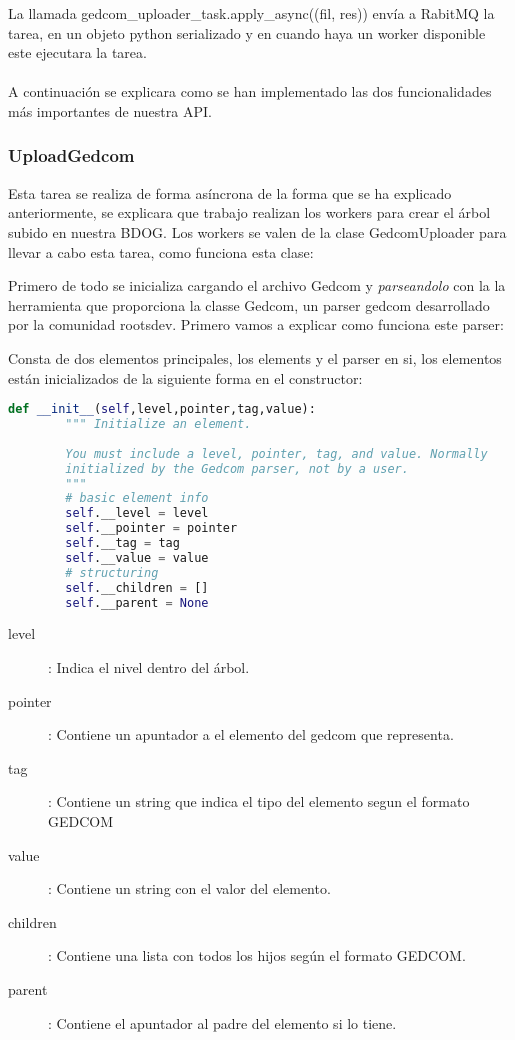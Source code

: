 La llamada gedcom\_uploader\_task.apply\_async((fil, res)) envía a RabitMQ la tarea, en un objeto python serializado y en cuando haya un worker disponible este ejecutara la tarea.\\\\
A continuación se explicara como se han implementado las dos funcionalidades más importantes de nuestra API.

\subsubsection{UploadGedcom}
Esta tarea se realiza de forma asíncrona de la forma que se ha explicado anteriormente, se explicara que trabajo realizan los workers para crear el árbol subido en nuestra BDOG.
Los workers se valen de la clase GedcomUploader para llevar a cabo esta tarea, como funciona esta clase:

Primero de todo se inicializa cargando el archivo Gedcom y \textit{parseandolo} con la la herramienta que proporciona la classe Gedcom, un parser gedcom desarrollado por la comunidad rootsdev. Primero vamos a explicar como funciona este parser:

Consta de dos elementos principales, los elements y el parser en si, los elementos están inicializados de la siguiente forma en el constructor:
\begin{lstlisting}[language=python]
def __init__(self,level,pointer,tag,value):
        """ Initialize an element.  
        
        You must include a level, pointer, tag, and value. Normally 
        initialized by the Gedcom parser, not by a user.
        """
        # basic element info
        self.__level = level
        self.__pointer = pointer
        self.__tag = tag
        self.__value = value
        # structuring
        self.__children = []
        self.__parent = None    
\end{lstlisting}
\begin{description}
\item[level]: Indica el nivel dentro del árbol.
\item[pointer]: Contiene un apuntador a el elemento del gedcom que representa.
\item[tag]: Contiene un string que indica el tipo del elemento segun el formato GEDCOM
\item[value]: Contiene un string con el valor del elemento.
\item[children]: Contiene una lista con todos los hijos según el formato GEDCOM.
\item[parent]: Contiene el apuntador al padre del elemento si lo tiene.
\end{description}

